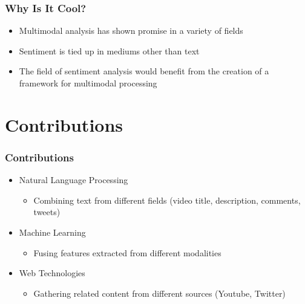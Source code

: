 \documentclass[brown]{beamer}
\begin{document}
\begin{frame}
  \frametitle{Why Is It Cool?}
  \begin{itemize}
  \item Multimodal analysis has shown promise in a variety of fields
  \item Sentiment is tied up in mediums other than text
  \item The field of sentiment analysis would benefit from the creation of a framework for multimodal processing
  \end{itemize}
\end{frame}

\section{Contributions}

\begin{frame}
  \frametitle{Contributions}
  \begin{itemize}
  \item Natural Language Processing
    \begin{itemize}
    \item Combining text from different fields (video title, description, comments, tweets)
    \end{itemize}
  \item Machine Learning
    \begin{itemize}
    \item Fusing features extracted from different modalities
    \end{itemize}
  \item Web Technologies
    \begin{itemize}
    \item Gathering related content from different sources (Youtube, Twitter)
    \end{itemize}
  \end{itemize}
\end{frame}
\end{document}
